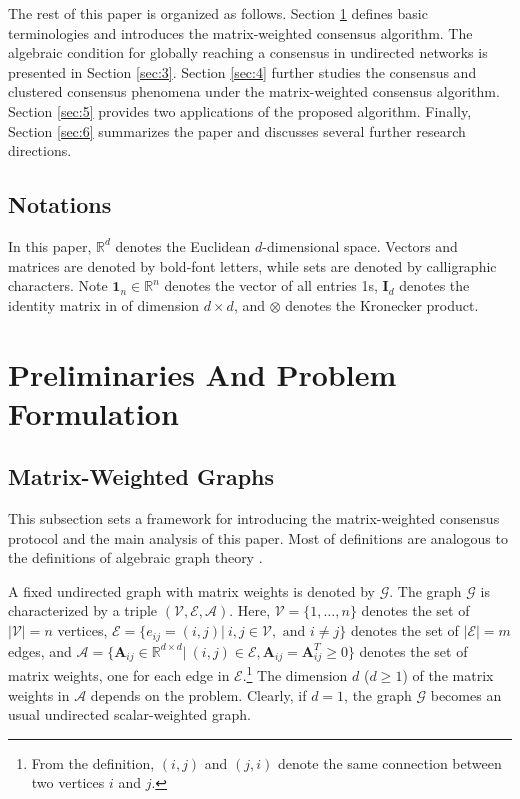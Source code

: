 \documentclass[draftclsnofoot,11pt,onecolumn]{IEEEtran}
\newcommand{\m}[1]{\mathbf{#1}}
\newcommand{\mc}[1]{\mathcal{#1}}
\newcommand{\mb}[1]{\mathbb{#1}}
\begin{document}
The rest of this paper is organized as follows. Section \ref{sec:2} defines basic terminologies and introduces the matrix-weighted consensus algorithm. The algebraic condition for globally reaching a consensus in undirected networks is presented in Section \ref{sec:3}. Section \ref{sec:4} further studies the consensus and clustered consensus phenomena under the matrix-weighted consensus algorithm. Section \ref{sec:5} provides two applications of the proposed algorithm. Finally, Section \ref{sec:6} summarizes the paper and discusses several further research directions.

\subsection{Notations}
In this paper, $\mb{R}^d$ denotes the Euclidean $d$-dimensional space. Vectors and matrices are denoted by bold-font letters, while sets are denoted by calligraphic characters. Note $\m{1}_n \in \mb{R}^{n}$ denotes the vector of all entries 1s, $\m{I}_{d}$ denotes the identity matrix in of dimension $d \times d$, and $\otimes$ denotes the Kronecker product.
\section{Preliminaries And Problem Formulation}
\label{sec:2}
\subsection{Matrix-Weighted Graphs}
This subsection sets a framework for introducing the matrix-weighted consensus protocol and the main analysis of this paper. Most of definitions are analogous to the definitions of algebraic graph theory \cite{Godsil2001}.

A fixed undirected graph with matrix weights is denoted by $\mc{G}$. The graph $\mc{G}$ is characterized by a triple $(\mc{V}, \mc{E}, \mc{A})$. Here, $\mc{V} = \{ 1, \ldots, n \}$ denotes the set of $|\mc{V}| = n$ vertices, $\mc{E} = \{ e_{ij} = (i, j)|~i, j \in \mc{V}, \text{ and } i \neq j \}$ denotes the set of $|\mc{E}| = m$ edges, and $\mc{A} = \{\m{A}_{ij} \in \mb{R}^{d\times d} |~(i,j) \in \mc{E},  \m{A}_{ij}=\m{A}_{ij}^T \geq 0 \}$ denotes the set of matrix weights, one for each edge in $\mc{E}$.\footnote{From the definition, $(i,j)$ and $(j,i)$ denote the same connection between two vertices $i$ and $j$.} The dimension $d$ ($d \geq 1$) of the matrix weights in $\mc{A}$ depends on the problem. Clearly, if $d=1$, the graph $\mc{G}$ becomes an usual undirected scalar-weighted graph. 
\end{document}
